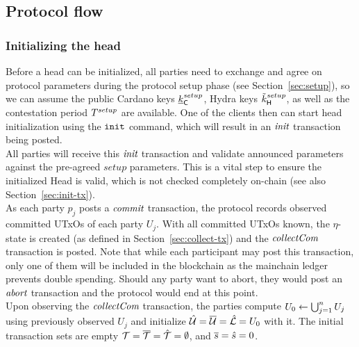 \subsection{Protocol flow}


\subsubsection{Initializing the head}

\quad Before a head can be initialized, all
parties need to exchange and agree on protocol parameters during the protocol
setup phase (see Section~\ref{sec:setup}), so we can assume the public Cardano
keys $\underline{k}_\mathsf{C}^{setup}$, Hydra keys $\tilde{k}_{\mathsf{H}}^{setup}$, as well as the contestation
period $T^{setup}$ are available. One of the clients then can start head initialization using the $\mathtt{init}$ command, which will result in an $\textit{init}$ transaction being posted.\\

\quad All parties will receive this $\textit{init}$
transaction and validate announced parameters against the pre-agreed $setup$
parameters. This is a vital step to ensure the initialized Head is valid, which
is not checked completely on-chain (see also Section~\ref{sec:init-tx}). \\

\quad As each party $p_{j}$ posts a
$\textit{commit}$ transaction, the protocol records observed committed UTxOs of each
party $U_j$. With all committed UTxOs known, the $\eta$-state is created (as
defined in Section~\ref{sec:collect-tx}) and the $\textit{collectCom}$ transaction is
posted. Note that while each participant may post this transaction, only one of
them will be included in the blockchain as the mainchain ledger prevents double
spending. Should any party want to abort, they would post an $\textit{abort}$
transaction and the protocol would end at this point.\\

\quad Upon observing the $\textit{collectCom}$
transaction, the parties compute $U_{0} \gets \bigcup_{j=1}^{n} U_j$ using
previously observed $U_j$ and initialize $\hat {\mathcal U} = \overline {\mathcal U} = \hat {\mathcal L} = U_{0}$
with it. The initial transaction sets are
empty ${\mathcal T} = \overline {\mathcal T} =\hat {\mathcal T} =\emptyset$, and $\overline s = \hat s = 0$.

